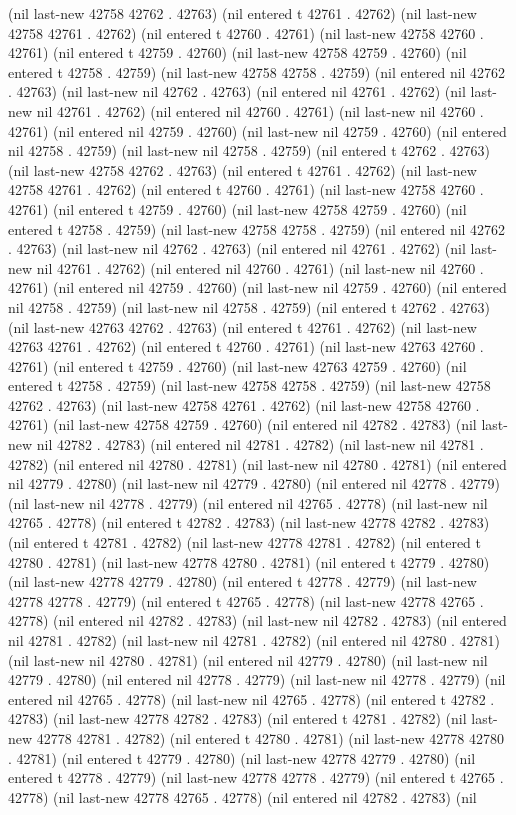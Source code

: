(nil last-new 42758 42762 . 42763) (nil entered t 42761 . 42762) (nil last-new 42758 42761 . 42762) (nil entered t 42760 . 42761) (nil last-new 42758 42760 . 42761) (nil entered t 42759 . 42760) (nil last-new 42758 42759 . 42760) (nil entered t 42758 . 42759) (nil last-new 42758 42758 . 42759) (nil entered nil 42762 . 42763) (nil last-new nil 42762 . 42763) (nil entered nil 42761 . 42762) (nil last-new nil 42761 . 42762) (nil entered nil 42760 . 42761) (nil last-new nil 42760 . 42761) (nil entered nil 42759 . 42760) (nil last-new nil 42759 . 42760) (nil entered nil 42758 . 42759) (nil last-new nil 42758 . 42759) (nil entered t 42762 . 42763) (nil last-new 42758 42762 . 42763) (nil entered t 42761 . 42762) (nil last-new 42758 42761 . 42762) (nil entered t 42760 . 42761) (nil last-new 42758 42760 . 42761) (nil entered t 42759 . 42760) (nil last-new 42758 42759 . 42760) (nil entered t 42758 . 42759) (nil last-new 42758 42758 . 42759) (nil entered nil 42762 . 42763) (nil last-new nil 42762 . 42763) (nil entered nil 42761 . 42762) (nil last-new nil 42761 . 42762) (nil entered nil 42760 . 42761) (nil last-new nil 42760 . 42761) (nil entered nil 42759 . 42760) (nil last-new nil 42759 . 42760) (nil entered nil 42758 . 42759) (nil last-new nil 42758 . 42759) (nil entered t 42762 . 42763) (nil last-new 42763 42762 . 42763) (nil entered t 42761 . 42762) (nil last-new 42763 42761 . 42762) (nil entered t 42760 . 42761) (nil last-new 42763 42760 . 42761) (nil entered t 42759 . 42760) (nil last-new 42763 42759 . 42760) (nil entered t 42758 . 42759) (nil last-new 42758 42758 . 42759) (nil last-new 42758 42762 . 42763) (nil last-new 42758 42761 . 42762) (nil last-new 42758 42760 . 42761) (nil last-new 42758 42759 . 42760) (nil entered nil 42782 . 42783) (nil last-new nil 42782 . 42783) (nil entered nil 42781 . 42782) (nil last-new nil 42781 . 42782) (nil entered nil 42780 . 42781) (nil last-new nil 42780 . 42781) (nil entered nil 42779 . 42780) (nil last-new nil 42779 . 42780) (nil entered nil 42778 . 42779) (nil last-new nil 42778 . 42779) (nil entered nil 42765 . 42778) (nil last-new nil 42765 . 42778) (nil entered t 42782 . 42783) (nil last-new 42778 42782 . 42783) (nil entered t 42781 . 42782) (nil last-new 42778 42781 . 42782) (nil entered t 42780 . 42781) (nil last-new 42778 42780 . 42781) (nil entered t 42779 . 42780) (nil last-new 42778 42779 . 42780) (nil entered t 42778 . 42779) (nil last-new 42778 42778 . 42779) (nil entered t 42765 . 42778) (nil last-new 42778 42765 . 42778) (nil entered nil 42782 . 42783) (nil last-new nil 42782 . 42783) (nil entered nil 42781 . 42782) (nil last-new nil 42781 . 42782) (nil entered nil 42780 . 42781) (nil last-new nil 42780 . 42781) (nil entered nil 42779 . 42780) (nil last-new nil 42779 . 42780) (nil entered nil 42778 . 42779) (nil last-new nil 42778 . 42779) (nil entered nil 42765 . 42778) (nil last-new nil 42765 . 42778) (nil entered t 42782 . 42783) (nil last-new 42778 42782 . 42783) (nil entered t 42781 . 42782) (nil last-new 42778 42781 . 42782) (nil entered t 42780 . 42781) (nil last-new 42778 42780 . 42781) (nil entered t 42779 . 42780) (nil last-new 42778 42779 . 42780) (nil entered t 42778 . 42779) (nil last-new 42778 42778 . 42779) (nil entered t 42765 . 42778) (nil last-new 42778 42765 . 42778) (nil entered nil 42782 . 42783) (nil 